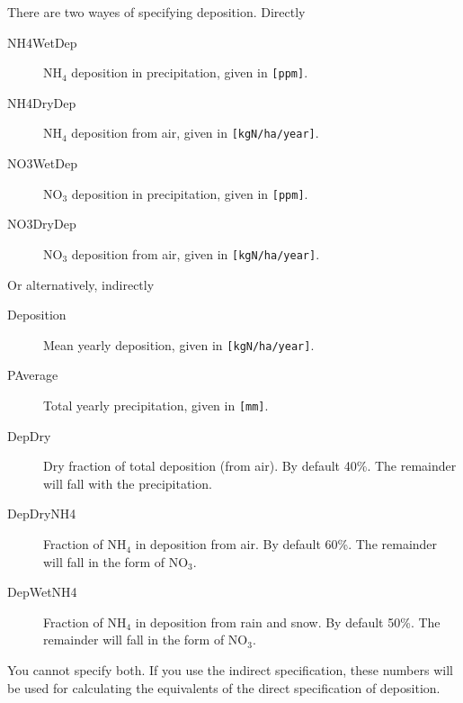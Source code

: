 There are two wayes of specifying deposition.  Directly
\begin{description}
\item[NH4WetDep] NH$_4$ deposition in precipitation, given in
  \texttt{[ppm]}.
\item[NH4DryDep] NH$_4$ deposition from air, given in
  \texttt{[kgN/ha/year]}.
\item[NO3WetDep] NO$_3$ deposition in precipitation, given in
  \texttt{[ppm]}.
\item[NO3DryDep] NO$_3$ deposition from air, given in
  \texttt{[kgN/ha/year]}.
\end{description}
Or alternatively, indirectly
\begin{description}
\item[Deposition] Mean yearly deposition, given in \texttt{[kgN/ha/year]}.
\item[PAverage] Total yearly precipitation, given in \texttt{[mm]}.
\item[DepDry] Dry fraction of total deposition (from air).  By
  default 40\%.  The remainder will fall with the precipitation.
\item[DepDryNH4] Fraction of NH$_4$ in deposition from air.  By
  default 60\%.  The remainder will fall in the form of NO$_3$.
\item[DepWetNH4] Fraction of NH$_4$ in deposition from rain and
  snow.  By default 50\%.  The remainder will fall in the form of
  NO$_3$.
\end{description}
You cannot specify both.  If you use the indirect specification,
these numbers will be used for calculating the equivalents of the
direct specification of deposition.


